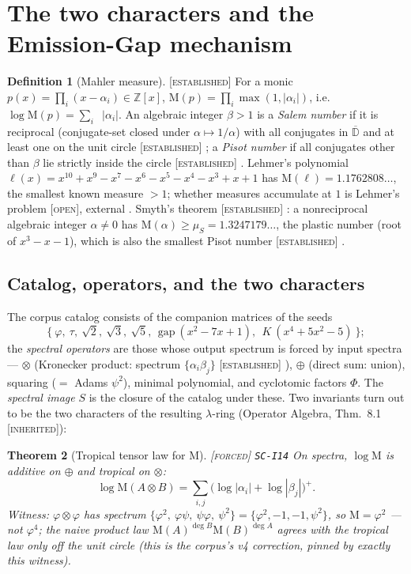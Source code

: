 \documentclass[11pt]{article}
\newcommand{\tagF}{\textcolor{cF}{\textsc{[forced]}}}
\newcommand{\tagI}{\textcolor{cI}{\textsc{[inherited]}}}
\newcommand{\tagE}{\textcolor{cE}{\textsc{[established]}}}
\newcommand{\tagO}{\textcolor{cO}{\textsc{[open]}}}
\newcommand{\hx}[1]{\textcolor{cC}{\footnotesize\texttt{#1}}}
\newcommand{\Z}{\mathbb{Z}}
\newcommand{\gp}{\varphi}
\newcommand{\gq}{\psi}
\newcommand{\gapc}{\mathrm{gap}}
\newcommand{\M}{\mathrm{M}}
\DeclareMathOperator{\lp}{\log^{+}}
\theoremstyle{plain}
\newtheorem{theorem}{Theorem}[section]
\theoremstyle{definition}
\newtheorem{definition}[theorem]{Definition}
\theoremstyle{remark}
\begin{document}
\section{The two characters and the Emission-Gap mechanism}\label{sec:characters}

\begin{definition}[Mahler measure]\label{def:mahler}\tagE{} \cite{Lehmer1933,EverestWard1999}
For a monic $p(x)=\prod_i(x-\alpha_i)\in\Z[x]$,
$\M(p)=\prod_i\max(1,|\alpha_i|)$, i.e.\ $\log\M(p)=\sum_i\lp|\alpha_i|$.
An algebraic integer $\beta>1$ is a \emph{Salem number} if it is reciprocal
(conjugate-set closed under $\alpha\mapsto1/\alpha$) with all conjugates in
$\overline{\mathbb D}$ and at least one on the unit circle \tagE{} \cite{Salem1963};
a \emph{Pisot number} if all conjugates other than $\beta$ lie strictly inside the
circle \tagE{} \cite{Siegel1944}. Lehmer's polynomial
$\ell(x)=x^{10}+x^9-x^7-x^6-x^5-x^4-x^3+x+1$ has
$\M(\ell)=1.1762808\ldots$, the smallest known measure $>1$; whether measures
accumulate at $1$ is Lehmer's problem \tagO{}, external \cite{Lehmer1933}.
Smyth's theorem \tagE{} \cite{Smyth1971}: a nonreciprocal algebraic integer $\alpha\neq0$
has $\M(\alpha)\ge\mu_S=1.3247179\ldots$, the plastic number (root of $x^3-x-1$),
which is also the smallest Pisot number \tagE{} \cite{Siegel1944}.
\end{definition}

\subsection{Catalog, operators, and the two characters}
The corpus catalog consists of the companion matrices of the seeds
\[
\{\ \gp,\ \tau,\ \sqrt2,\ \sqrt3,\ \sqrt5,\ \ \gapc\ (x^2{-}7x{+}1),\ \ K\ (x^4{+}5x^2{-}5)\ \};
\]
the \emph{spectral operators} are those whose output spectrum is forced by input
spectra --- $\otimes$ (Kronecker product: spectrum $\{\alpha_i\beta_j\}$
\tagE{} \cite{HornJohnson1991}), $\oplus$ (direct sum: union), squaring
($=$ Adams $\psi^2$), minimal polynomial, and cyclotomic factors $\Phi$. The
\emph{spectral image} $S$ is the closure of the catalog under these. Two invariants
turn out to be the two characters of the resulting $\lambda$-ring
(Operator Algebra, Thm.\ 8.1 \tagI{}):

\begin{theorem}[Tropical tensor law for $\M$]\label{thm:tropical}\tagF{} \hx{SC-I14}
On spectra, $\log\M$ is additive on $\oplus$ and \emph{tropical} on $\otimes$:
\[
\log\M(A\otimes B)=\sum_{i,j}\bigl(\log|\alpha_i|+\log|\beta_j|\bigr)^{+}.
\]
Witness: $\gp\otimes\gp$ has spectrum $\{\gp^2,\ \gp\gq,\ \gq\gp,\ \gq^2\}
=\{\gp^2,-1,-1,\gq^2\}$, so $\M=\gp^2$ --- \emph{not} $\gp^4$; the naive product law
$\M(A)^{\deg B}\M(B)^{\deg A}$ agrees with the tropical law only off the unit circle
(this is the corpus's v4 correction, pinned by exactly this witness).
\end{theorem}
\end{document}
